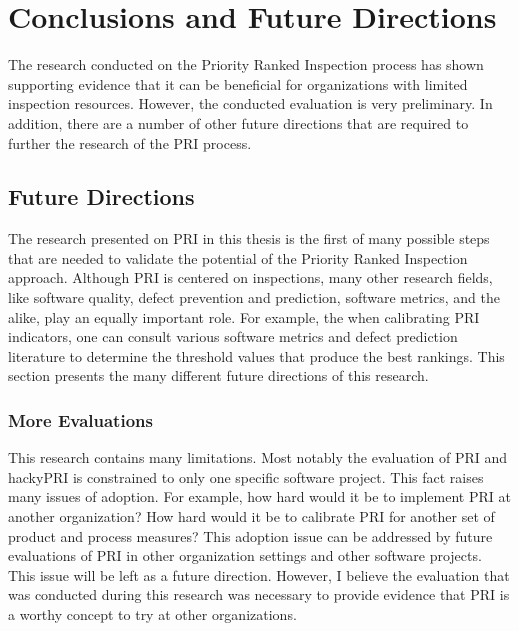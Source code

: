 
\chapter{Conclusions and Future Directions}
\label{chapter:contribution}
The research conducted on the Priority Ranked Inspection process has shown
supporting evidence that it can be beneficial for organizations with
limited inspection resources. However, the conducted evaluation is very
preliminary. In addition, there are a number of other future directions
that are required to further the research of the PRI process.

\section{Future Directions}
The research presented on PRI in this thesis is the first of many possible
steps that are needed to validate the potential of the Priority Ranked
Inspection approach. Although PRI is centered on inspections, many other
research fields, like software quality, defect prevention and prediction,
software metrics, and the alike, play an equally important role.  For
example, the when calibrating PRI indicators, one can consult various
software metrics and defect prediction literature to determine the
threshold values that produce the best rankings. This section presents the
many different future directions of this research.

\subsection{More Evaluations}
This research contains many limitations. Most notably the evaluation of PRI
and hackyPRI is constrained to only one specific software project. This
fact raises many issues of adoption. For example, how hard would it be to
implement PRI at another organization? How hard would it be to calibrate
PRI for another set of product and process measures? This adoption issue
can be addressed by future evaluations of PRI in other organization
settings and other software projects. This issue will be left as a future
direction. However, I believe the evaluation that was conducted during this
research was necessary to provide evidence that PRI is a worthy concept to
try at other organizations.

